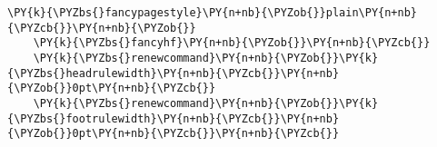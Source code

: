 \begin{Verbatim}[commandchars=\\\{\}]
\PY{k}{\PYZbs{}fancypagestyle}\PY{n+nb}{\PYZob{}}plain\PY{n+nb}{\PYZcb{}}\PY{n+nb}{\PYZob{}}
    \PY{k}{\PYZbs{}fancyhf}\PY{n+nb}{\PYZob{}}\PY{n+nb}{\PYZcb{}}
    \PY{k}{\PYZbs{}renewcommand}\PY{n+nb}{\PYZob{}}\PY{k}{\PYZbs{}headrulewidth}\PY{n+nb}{\PYZcb{}}\PY{n+nb}{\PYZob{}}0pt\PY{n+nb}{\PYZcb{}}
    \PY{k}{\PYZbs{}renewcommand}\PY{n+nb}{\PYZob{}}\PY{k}{\PYZbs{}footrulewidth}\PY{n+nb}{\PYZcb{}}\PY{n+nb}{\PYZob{}}0pt\PY{n+nb}{\PYZcb{}}\PY{n+nb}{\PYZcb{}}
\end{Verbatim}
